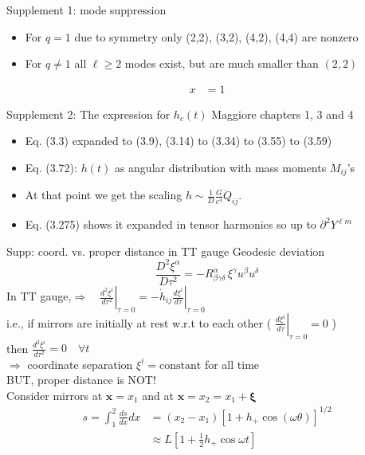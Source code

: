 \documentclass[xcolor=dvipsnames,handout,t]{beamer}
\renewcommand{\t}{\theta}
\begin{document}
\begin{frame}{Supplement 1: mode suppression}
\begin{itemize}
 \item For $q=1$ due to symmetry only (2,2), (3,2), (4,2), (4,4) are nonzero 
 \item For $q\ne 1$ all $\ell \ge 2$ modes exist, but are much smaller than $(2,2)$
\end{itemize}
\begin{align*}
      x &=1
      \end{align*}
\end{frame}


\begin{frame}{Supplement 2: The expression for $h_c(t)$}
Maggiore chapters 1, 3 and 4
\begin{itemize}
 \item Eq. (3.3) expanded to (3.9), (3.14) to (3.34) to (3.55) to (3.59)
 \item Eq. (3.72): $h(t)$ as angular distribution with mass moments $\ddot{M}_{ij}$'s
 \item At that point we get the scaling $h \sim \tfrac{1}{D}\tfrac{G}{c^4}\ddot{Q}_{ij}$.
 \item Eq. (3.275) shows it expanded in tensor harmonics so up to $\partial^2 Y^{\ell m}$
\end{itemize}
\end{frame}

\begin{frame}{Supp: coord. vs. proper distance in TT gauge}
  Geodesic deviation 
  \[
   \frac{D^2 \xi^\alpha}{D\tau^2} = -R^\alpha_{\beta \gamma\delta}\, \xi^\gamma u^\beta u^\delta 
  \]
In TT gauge,\qquad  $\Longrightarrow \quad\left.\tfrac{d^2 \xi^i}{d\tau^2}\right|_{\tau=0} = -\left. \dot{h}_{ij} \tfrac{d\xi^i}{d\tau}\right|_{\tau=0}$\\
i.e., if mirrors are initially at rest w.r.t to each other ( $\left. \tfrac{d\xi^i}{d\tau}\right|_{\tau=0} =0$ )\\
then $\tfrac{d^2 \xi^i}{d\tau^2}=0\quad \forall t$ \\
$\Longrightarrow$ coordinate separation $\xi^i = \text{constant}$ for all time \\
BUT, proper distance is NOT! \\
Consider mirrors at $\mathbf{x}=x_1$ and at $\mathbf{x}=x_2=x_1+\mathbf{\xi}$
\begin{align*}
  s = \int_1^2 \tfrac{ds}{dx}dx &= (x_2-x_1) \left[ 1 + h_+ \cos(\omega\t)\right]^{1/2} \\
			      & \approx L \left[ 1+\tfrac{1}{2} h_+ \cos\omega t \right] 
\end{align*}
 \end{frame}
\end{document}
